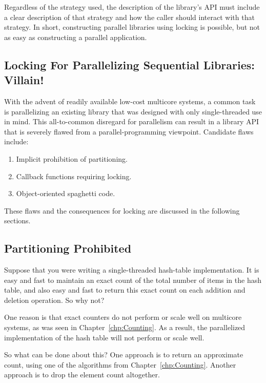 Regardless of the strategy used, the description of the library's API
must include a clear description of that strategy and how the caller
should interact with that strategy.
In short, constructing parallel libraries using locking is possible,
but not as easy as constructing a parallel application.

\subsection{Locking For Parallelizing Sequential Libraries: Villain!}
\label{sec:locking:Locking For Parallelizing Sequential Libraries: Villain!}

With the advent of readily available low-cost multicore systems,
a common task is parallelizing an existing library that was designed
with only single-threaded use in mind.
This all-to-common disregard for parallelism can result in a library
API that is severely flawed from a parallel-programming viewpoint.
Candidate flaws include:

\begin{enumerate}
\item	Implicit prohibition of partitioning.
\item	Callback functions requiring locking.
\item	Object-oriented spaghetti code.
\end{enumerate}

These flaws and the consequences for locking are discussed in the following
sections.

\subsection{Partitioning Prohibited}
\label{sec:locking:Partitioning Prohibited}

Suppose that you were writing a single-threaded hash-table implementation.
It is easy and fast to maintain an exact count of the total number of items
in the hash table, and also easy and fast to return this exact count on each
addition and deletion operation.
So why not?

One reason is that exact counters do not perform or scale well on
multicore systems, as was
seen in Chapter~\ref{chp:Counting}.
As a result, the parallelized implementation of the hash table will not
perform or scale well.

So what can be done about this?
One approach is to return an approximate count, using one of the algorithms
from Chapter~\ref{chp:Counting}.
Another approach is to drop the element count altogether.

